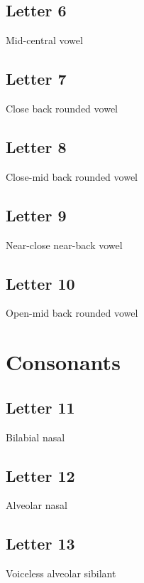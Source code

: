 \documentclass{article}
\newcommand{\letter}[1]{\begin{center}\resizebox{1cm}{!}{\texttt{[image: \#1]}}\end{center}}
\begin{document}
\letter{letters/vowels/5.JPG}

\subsection{Letter 6}
Mid-central vowel

\letter{letters/vowels/6.JPG}

\subsection{Letter 7}
Close back rounded vowel

\letter{letters/vowels/7.JPG}

\subsection{Letter 8}
Close-mid back rounded vowel

\letter{letters/vowels/8.JPG}

\subsection{Letter 9}
Near-close near-back vowel

\letter{letters/vowels/9.JPG}


\subsection{Letter 10}
Open-mid back rounded vowel

\letter{letters/vowels/10.JPG}



\section{Consonants}
\subsection{Letter 11}
Bilabial nasal

\letter{letters/consonants/11.JPG}

\subsection{Letter 12}
Alveolar nasal

\letter{letters/consonants/12.JPG}

\subsection{Letter 13}
Voiceless alveolar sibilant
\end{document}
